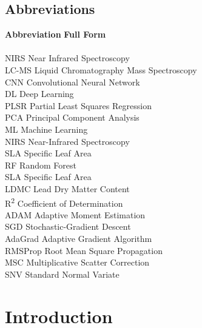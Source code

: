 \documentclass[12pt,a4paper]{report}
\begin{document}
\newpage
\tableofcontents


\newpage
\section*{Abbreviations}
\begin{tabbing}
    \textbf{Abbreviation} \hspace{2cm} \= \textbf{Full Form} \\ 
  \\

    NIRS \> Near Infrared Spectroscopy \\
    LC-MS \> Liquid Chromatography Mass Spectroscopy \\
    CNN \> Convolutional Neural Network \\
    DL \> Deep Learning \\
    PLSR \> Partial Least Squares Regression \\
    PCA \> Principal Component Analysis \\
    ML \> Machine Learning \\
    NIRS \> Near-Infrared Spectroscopy \\
    SLA \> Specific Leaf Area \\
    RF \> Random Forest \\
    SLA \> Specific Leaf Area \\
    LDMC \> Lead Dry Matter Content \\
    R\textsuperscript{2} \> Coefficient of Determination \\
    ADAM \> Adaptive Moment Estimation \\
    SGD \> Stochastic-Gradient Descent \\
    AdaGrad \> Adaptive Gradient Algorithm \\
    RMSProp \> Root Mean Square Propagation \\
    MSC \> Multiplicative Scatter Correction \\
    SNV \> Standard Normal Variate

\end{tabbing}


\chapter{Introduction}
\end{document}
